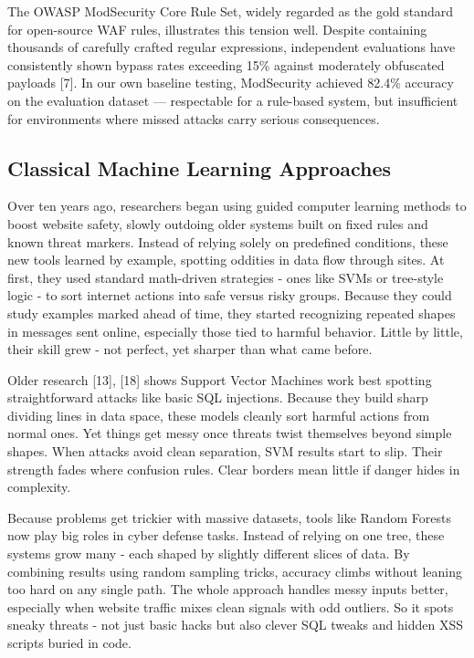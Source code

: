 \documentclass[journal,onecolumn]{IEEEtran}
\begin{document}
The OWASP ModSecurity Core Rule Set, widely regarded as the gold standard for open-source WAF rules, illustrates this tension well. Despite containing thousands of carefully crafted regular expressions, independent evaluations have consistently shown bypass rates exceeding 15\% against moderately obfuscated payloads [7]. In our own baseline testing, ModSecurity achieved 82.4\% accuracy on the evaluation dataset --- respectable for a rule-based system, but insufficient for environments where missed attacks carry serious consequences.

\subsection{Classical Machine Learning Approaches}

Over ten years ago, researchers began using guided computer learning methods to boost website safety, slowly outdoing older systems built on fixed rules and known threat markers. Instead of relying solely on predefined conditions, these new tools learned by example, spotting oddities in data flow through sites. At first, they used standard math-driven strategies - ones like SVMs or tree-style logic - to sort internet actions into safe versus risky groups. Because they could study examples marked ahead of time, they started recognizing repeated shapes in messages sent online, especially those tied to harmful behavior. Little by little, their skill grew - not perfect, yet sharper than what came before.

Older research [13], [18] shows Support Vector Machines work best spotting straightforward attacks like basic SQL injections. Because they build sharp dividing lines in data space, these models cleanly sort harmful actions from normal ones. Yet things get messy once threats twist themselves beyond simple shapes. When attacks avoid clean separation, SVM results start to slip. Their strength fades where confusion rules. Clear borders mean little if danger hides in complexity.

Because problems get trickier with massive datasets, tools like Random Forests now play big roles in cyber defense tasks. Instead of relying on one tree, these systems grow many - each shaped by slightly different slices of data. By combining results using random sampling tricks, accuracy climbs without leaning too hard on any single path. The whole approach handles messy inputs better, especially when website traffic mixes clean signals with odd outliers. So it spots sneaky threats - not just basic hacks but also clever SQL tweaks and hidden XSS scripts buried in code.
\end{document}
